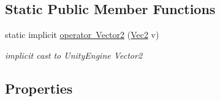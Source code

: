 \subsection*{Static Public Member Functions}
\begin{DoxyCompactItemize}
\item 
static implicit \mbox{\hyperlink{class_virt_muse_web_1_1_utility_1_1_vec2_ae7eea094143341c9797862761fd1b6d9}{operator Vector2}} (\mbox{\hyperlink{class_virt_muse_web_1_1_utility_1_1_vec2}{Vec2}} v)
\begin{DoxyCompactList}\small\item\em implicit cast to Unity\+Engine Vector2 \end{DoxyCompactList}\end{DoxyCompactItemize}
\subsection*{Properties}
